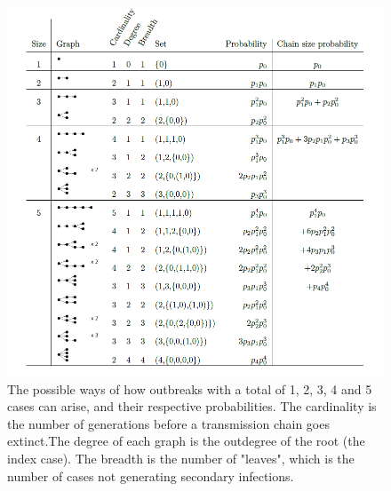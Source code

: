 \documentclass{imammb}
\numberwithin{equation}{section}
\begin{document}
\begin{figure}
    \centering
    \includegraphics{Fig1.png}
    \caption{The possible ways of how outbreaks with a total of 1, 2, 3, 4 and 5 cases can arise, and their respective probabilities. The cardinality is the number of generations before a transmission chain goes extinct.The degree of each graph is the outdegree of the root (the index case).  The breadth is the number of "leaves", which is the number of cases not generating secondary infections.}
    \label{fig:chainsdiagram}
\end{figure}
\end{document}
